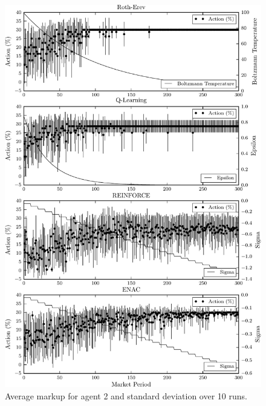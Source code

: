 \begin{figure}
  \centering
  \includegraphics{figures/fig5_1_action_a2}
  \caption{Average markup for agent 2 and standard deviation over 10 runs.}
  \label{fig:5_1_action_a2}
\end{figure}

